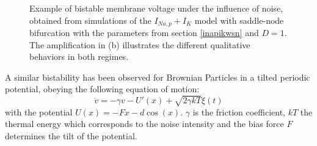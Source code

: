 \documentclass[12pt,a4paper]{article}
\begin{document}
\begin{figure}[H]		 
	\caption{Example of bistable membrane voltage under the influence of noise, obtained from simulations of the $I_{Na,p}+I_K$ model with saddle-node bifurcation with the parameters from section \ref{inapikwsn} and $D=1$. The amplification in (b) illustrates the different qualitative behaviors in both regimes.}
	\label{bistablevolt} 
\end{figure}

A similar bistability has been observed for Brownian Particles in a tilted periodic potential, obeying the following equation of motion\cite{bpp}: 
\begin{equation*}
\dot{v}=-\gamma v-U'(x)+\sqrt{2\gamma kT}\xi(t)
\end{equation*}
with the potential $U(x)=-Fx-d\cos(x)$. $\gamma$ is the friction coefficient, $kT$ the thermal energy which corresponds to the noise intensity and the bias force $F$ determines the tilt of the potential.
 
\end{document}
